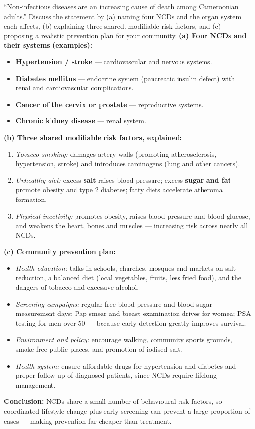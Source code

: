 \documentclass[11pt]{article}
\begin{document}
\begin{exoresolu}
``Non-infectious diseases are an increasing cause of death among Cameroonian adults.'' Discuss the statement by (a) naming four NCDs and the organ system each affects, (b) explaining three shared, modifiable risk factors, and (c) proposing a realistic prevention plan for your community.
\tcblower
\textbf{(a) Four NCDs and their systems (examples):}
\begin{itemize}
\item \textbf{Hypertension / stroke} — cardiovascular and nervous systems.
\item \textbf{Diabetes mellitus} — endocrine system (pancreatic insulin defect) with renal and cardiovascular complications.
\item \textbf{Cancer of the cervix or prostate} — reproductive systems.
\item \textbf{Chronic kidney disease} — renal system.
\end{itemize}

\textbf{(b) Three shared modifiable risk factors, explained:}
\begin{enumerate}
\item \emph{Tobacco smoking:} damages artery walls (promoting atherosclerosis, hypertension, stroke) and introduces carcinogens (lung and other cancers).
\item \emph{Unhealthy diet:} excess \textbf{salt} raises blood pressure; excess \textbf{sugar and fat} promote obesity and type 2 diabetes; fatty diets accelerate atheroma formation.
\item \emph{Physical inactivity:} promotes obesity, raises blood pressure and blood glucose, and weakens the heart, bones and muscles — increasing risk across nearly all NCDs.
\end{enumerate}

\textbf{(c) Community prevention plan:}
\begin{itemize}
\item \emph{Health education:} talks in schools, churches, mosques and markets on salt reduction, a balanced diet (local vegetables, fruits, less fried food), and the dangers of tobacco and excessive alcohol.
\item \emph{Screening campaigns:} regular free blood-pressure and blood-sugar measurement days; Pap smear and breast examination drives for women; PSA testing for men over 50 — because early detection greatly improves survival.
\item \emph{Environment and policy:} encourage walking, community sports grounds, smoke-free public places, and promotion of iodised salt.
\item \emph{Health system:} ensure affordable drugs for hypertension and diabetes and proper follow-up of diagnosed patients, since NCDs require lifelong management.
\end{itemize}

\textbf{Conclusion:} NCDs share a small number of behavioural risk factors, so coordinated lifestyle change plus early screening can prevent a large proportion of cases — making prevention far cheaper than treatment.
\end{exoresolu}
\end{document}
